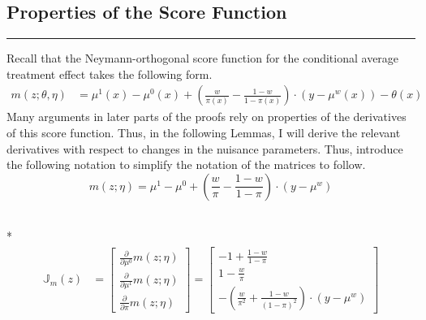 \subsection{Properties of the Score Function}
\hrule

Recall that the Neymann-orthogonal score function for the conditional average treatment effect takes the following form.
\begin{equation}
    \begin{aligned}
        m\left(z; \theta, \eta\right)
		& = \mu^{1}\left(x\right) - \mu^{0}\left(x\right) 
        + \left(\frac{w}{\pi\left(x\right)} - \frac{1 - w}{1 - \pi\left(x\right)}\right) \cdot \left(y - \mu^{w}\left(x\right)\right) -  \theta\left(x\right)
	\end{aligned}
\end{equation}
Many arguments in later parts of the proofs rely on properties of the derivatives of this score function.
Thus, in the following Lemmas, I will derive the relevant derivatives with respect to changes in the nuisance parameters.
Thus, introduce the following notation to simplify the notation of the matrices to follow.
\begin{equation}
    m\left(z; \eta\right) = \mu^{1} - \mu^{0} + \left(\frac{w}{\pi} - \frac{1 - w}{1 - \pi}\right) \cdot \left(y - \mu^{w}\right)
\end{equation}

\begin{boxD}
    \begin{lem}\label{lem:score_jacobian}\mbox{}\\*
    \begin{equation}
        \begin{aligned}
            \mathbb{J}_{m}(z)
            & = \begin{bmatrix}
                \frac{\partial}{\partial \mu^{0}} m\left(z; \eta\right)\\
                \frac{\partial}{\partial \mu^{1}} m\left(z; \eta\right)\\
                \frac{\partial}{\partial \pi} m\left(z; \eta\right)
            \end{bmatrix} 
            = \begin{bmatrix}
                -1 + \frac{1 - w}{1 - \pi} \\
                1 - \frac{w}{\pi} \\
                -\left(\frac{w}{\pi^2} + \frac{1-w}{\left(1-\pi\right)^{2}}\right)  \cdot \left(y - \mu^{w}\right)
            \end{bmatrix} 
        \end{aligned}
    \end{equation}
\end{lem}
\end{boxD}

